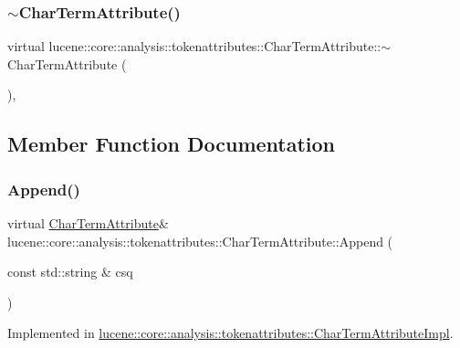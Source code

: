 \subsubsection{\texorpdfstring{$\sim$\+Char\+Term\+Attribute()}{~CharTermAttribute()}}
{\footnotesize\ttfamily virtual lucene\+::core\+::analysis\+::tokenattributes\+::\+Char\+Term\+Attribute\+::$\sim$\+Char\+Term\+Attribute (\begin{DoxyParamCaption}{ }\end{DoxyParamCaption})\hspace{0.3cm}{\ttfamily [inline]}, {\ttfamily [virtual]}}



\subsection{Member Function Documentation}
\mbox{\label{classlucene_1_1core_1_1analysis_1_1tokenattributes_1_1CharTermAttribute_a721493e2513c3cbb5818cab4ec36e277}} 
\subsubsection{\texorpdfstring{Append()}{Append()}\hspace{0.1cm}{\footnotesize\ttfamily [1/4]}}
{\footnotesize\ttfamily virtual \mbox{\hyperlink{classlucene_1_1core_1_1analysis_1_1tokenattributes_1_1CharTermAttribute}{Char\+Term\+Attribute}}\& lucene\+::core\+::analysis\+::tokenattributes\+::\+Char\+Term\+Attribute\+::\+Append (\begin{DoxyParamCaption}\item[{const std\+::string \&}]{csq }\end{DoxyParamCaption})\hspace{0.3cm}{\ttfamily [pure virtual]}}



Implemented in \mbox{\hyperlink{classlucene_1_1core_1_1analysis_1_1tokenattributes_1_1CharTermAttributeImpl_aaf6bf26fa572599e284845f67b444900}{lucene\+::core\+::analysis\+::tokenattributes\+::\+Char\+Term\+Attribute\+Impl}}.

